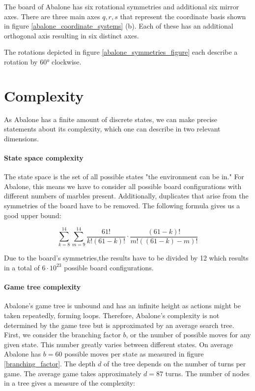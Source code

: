 The board of Abalone has six rotational symmetries and additional six mirror axes. There are three main axes $q, r, s$ that represent the coordinate basis shown in figure \ref{abalone_coordinate_systems} (b). Each of these has an additional orthogonal axis resulting in six distinct axes.

The rotations depicted in figure \ref{abalone_symmetries_figure} each describe a rotation by 60° clockwise.

\section{Complexity}
As Abalone has a finite amount of discrete states, we can make precise statements about its complexity, which one can describe in two relevant dimensions.

\paragraph{State space complexity}
\label{state_space_complexity}

The state space is the set of all possible states "the environment can be in." \cite[p. 150]{russell_artificial_2021} For Abalone, this means we have to consider all possible board configurations with different numbers of marbles present. Additionally, duplicates that arise from the symmetries of the board have to be removed. The following formula gives us a good upper bound:

\begin{equation}
    \sum_{k=8}^{14}\sum_{m=9}^{14}\frac{61!}{k!(61-k)!}\cdot\frac{(61-k)!}{m!((61-k)-m)!}
\end{equation}

Due to the board's symmetries,the results have to be divided by 12 which results in a total of $ 6 \cdot 10^{23} $ possible board configurations. \cite[p. 4]{lemmens_constructing_2005}

\paragraph{Game tree complexity} Abalone's game tree is unbound and has an infinite height as actions might be taken repeatedly, forming loops. Therefore, Abalone's complexity is not determined by the game tree but is approximated by an average search tree. First, we consider the branching factor $ b $, or the number of possible moves for any given state. This number greatly varies between different states. On average Abalone has $ b = 60 $ possible moves per state as measured in figure \ref{branching_factor}. The depth $ d $ of the tree depends on the number of turns per game. The average game takes approximately $ d = 87 $ turns. The number of nodes in a tree gives a measure of the complexity:

